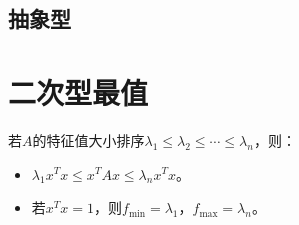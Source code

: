 \documentclass[UTF8, 12pt]{ctexart}
\begin{document}
\subsection{抽象型}

\section{二次型最值}

若$A$的特征值大小排序$\lambda_1\leqslant\lambda_2\leqslant\cdots\leqslant\lambda_n$，则：

\begin{itemize}
    \item $\lambda_1x^Tx\leqslant x^TAx\leqslant\lambda_nx^Tx$。
    \item 若$x^Tx=1$，则$f_{\min}=\lambda_1$，$f_{\max}=\lambda_n$。
\end{itemize}
\end{document}
